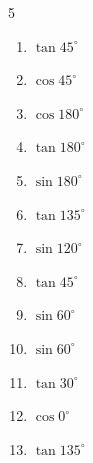 \begin{multicols}{5}
\begin{enumerate}
  \item $\displaystyle \tan{45^\circ}$

        \phantom{$\displaystyle =1$}

  \item $\displaystyle \cos{45^\circ}$


  \item $\displaystyle \cos{180^\circ}$

        \phantom{$\displaystyle =-1$}

  \item $\displaystyle \tan{180^\circ}$

        \phantom{$\displaystyle =0$}

  \item $\displaystyle \sin{180^\circ}$

        \phantom{$\displaystyle =0$}

  \item $\displaystyle \tan{135^\circ}$

        \phantom{$\displaystyle =-1$}

  \item $\displaystyle \sin{120^\circ}$


  \item $\displaystyle \tan{45^\circ}$

        \phantom{$\displaystyle =1$}

  \item $\displaystyle \sin{60^\circ}$


  \item $\displaystyle \sin{60^\circ}$


  \item $\displaystyle \tan{30^\circ}$


\columnbreak %

\resetques

  \item $\displaystyle \cos{0^\circ}$

        \phantom{$\displaystyle =1$}

  \item $\displaystyle \tan{135^\circ}$


\end{enumerate}
\end{multicols}
